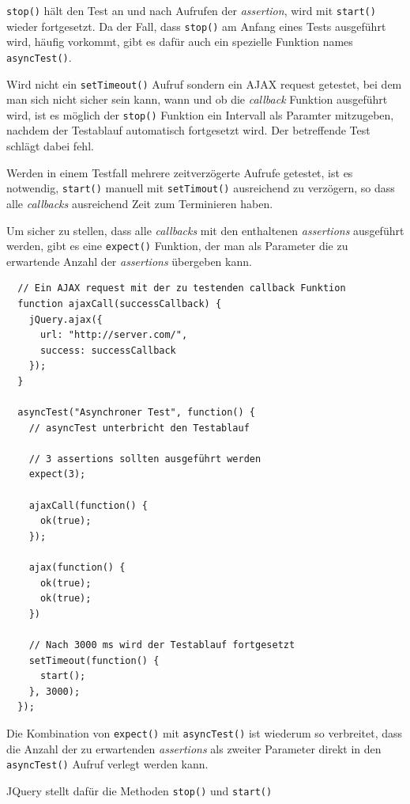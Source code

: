 \documentclass[11pt, a4paper]{article}
\begin{document}
\texttt{stop()} hält den Test an und nach Aufrufen der \emph{assertion}, wird
mit \texttt{start()} wieder fortgesetzt. Da der Fall, dass \texttt{stop()} am
Anfang eines Tests ausgeführt wird, häufig vorkommt, gibt es dafür auch ein
spezielle Funktion names \texttt{asyncTest()}.

Wird nicht ein \texttt{setTimeout()} Aufruf sondern ein AJAX request
getestet, bei dem man sich nicht sicher sein kann, wann und ob die
\emph{callback} Funktion ausgeführt wird, ist es möglich der \texttt{stop()}
Funktion ein Intervall als Paramter mitzugeben, nachdem der Testablauf
automatisch fortgesetzt wird. Der betreffende Test schlägt dabei fehl.

Werden in einem Testfall mehrere zeitverzögerte Aufrufe getestet, ist es
notwendig, \texttt{start()} manuell mit \texttt{setTimout()} ausreichend zu
verzögern, so dass alle \emph{callbacks} ausreichend Zeit zum Terminieren haben.

Um sicher zu stellen, dass alle \emph{callbacks} mit den enthaltenen
\emph{assertions} ausgeführt werden, gibt es eine \texttt{expect()} Funktion,
der man als Parameter die zu erwartende Anzahl der \emph{assertions} übergeben
kann.

\begin{verbatim}
  // Ein AJAX request mit der zu testenden callback Funktion
  function ajaxCall(successCallback) {
    jQuery.ajax({
      url: "http://server.com/",
      success: successCallback
    });
  }

  asyncTest("Asynchroner Test", function() {
    // asyncTest unterbricht den Testablauf

    // 3 assertions sollten ausgeführt werden
    expect(3);

    ajaxCall(function() {
      ok(true);
    });

    ajax(function() {
      ok(true);
      ok(true);
    })

    // Nach 3000 ms wird der Testablauf fortgesetzt
    setTimeout(function() {
      start();
    }, 3000);
  });
\end{verbatim}

Die Kombination von \texttt{expect()} mit \texttt{asyncTest()} ist wiederum so
verbreitet, dass die Anzahl der zu erwartenden \emph{assertions} als zweiter
Parameter direkt in den \texttt{asyncTest()} Aufruf verlegt werden kann.

JQuery stellt dafür die Methoden \texttt{stop()} und \texttt{start()}
\end{document}
